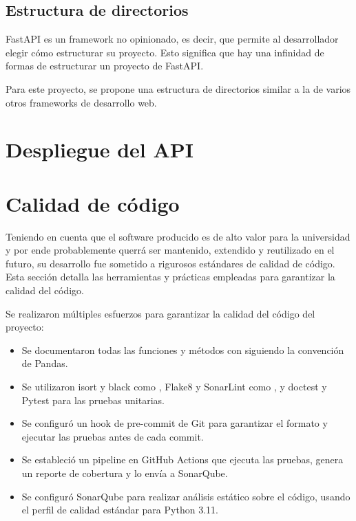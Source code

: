 \subsection{Estructura de directorios}

FastAPI es un framework no opinionado, es decir, que permite al desarrollador elegir cómo estructurar su proyecto. Esto significa que hay una infinidad de formas de estructurar un proyecto de FastAPI.

Para este proyecto, se propone una estructura de directorios similar a la de varios otros frameworks de desarrollo web. %

\section{Despliegue del API}


\section{Calidad de código}

Teniendo en cuenta que el software producido es de alto valor para la universidad y por ende probablemente querrá ser mantenido, extendido y reutilizado en el futuro, su desarrollo fue sometido a rigurosos estándares de calidad de código. Esta sección detalla las herramientas y prácticas empleadas para garantizar la calidad del código.

\begin{resumen}
	Se realizaron múltiples esfuerzos para garantizar la calidad del código del proyecto:
	\begin{itemize}
		\item Se documentaron todas las funciones y métodos con  siguiendo la convención de \gls{Pandas}.
		\item Se utilizaron \gls{isort} y \gls{black} como , \gls{Flake8} y \gls{SonarLint} como , y \gls{doctest} y \gls{Pytest} para las \gls{pruebas unitarias}.
		\item Se configuró un \gls{hook} de pre-commit de \gls{Git} para garantizar el formato y ejecutar las pruebas antes de cada commit.
		\item Se estableció un \gls{pipeline} en \gls{GitHub Actions} que ejecuta las pruebas, genera un reporte de cobertura y lo envía a \gls{SonarQube}.
		\item Se configuró \gls{SonarQube} para realizar análisis estático sobre el código, usando el \gls{perfil de calidad} estándar para \gls{Python} 3.11.
	\end{itemize}
\end{resumen}

